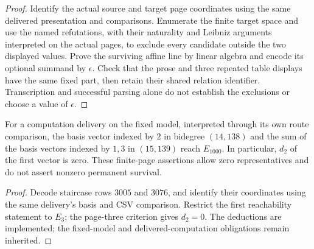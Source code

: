 \begin{proof}
  Identify the actual source and target page coordinates using the same
  delivered presentation and comparisons. Enumerate the finite target space
  and use the named refutations, with their naturality and Leibniz arguments
  interpreted on the actual pages, to exclude every candidate outside the
  two displayed values. Prove the surviving affine line by linear algebra
  and encode its optional summand by $\epsilon$. Check that the prose and
  three repeated table displays have the same fixed part, then retain their
  shared relation identifier. Transcription and successful parsing alone do
  not establish the exclusions or choose a value of $\epsilon$.
\end{proof}

\begin{lemma}
  \label{lem:near126-staircase-correction-cycles}
  \notready
  For a computation delivery on the fixed model, interpreted through its
  own route comparison, the basis vector indexed by $2$ in bidegree
  $(14,138)$ and the sum of the basis vectors indexed by $1,3$ in
  $(15,139)$ reach $E_{1000}$. In particular, $d_2$ of the first vector
  is zero. These finite-page assertions allow zero representatives and
  do not assert nonzero permanent survival.
\end{lemma}
\begin{proof}
  Decode staircase rows $3005$ and $3076$, and identify their coordinates
  using the same delivery's basis and CSV comparison. Restrict the first
  reachability statement to $E_3$; the page-three criterion gives $d_2=0$.
  The deductions are implemented; the fixed-model and delivered-computation
  obligations remain inherited.
\end{proof}

